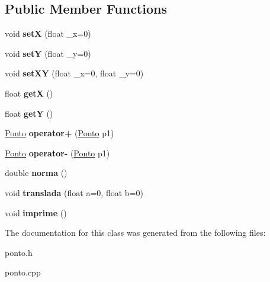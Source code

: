 \subsection*{Public Member Functions}
\begin{DoxyCompactItemize}
\item 
\mbox{\label{class_ponto_abfab19c004021c98c75b27b933498466}} 
void {\bfseries setX} (float \+\_\+x=0)
\item 
\mbox{\label{class_ponto_a9b87ab5a7ba74d55d060ed6257af1ebc}} 
void {\bfseries setY} (float \+\_\+y=0)
\item 
\mbox{\label{class_ponto_aa0f87ed597205dbd1cdc442b3ad04772}} 
void {\bfseries set\+XY} (float \+\_\+x=0, float \+\_\+y=0)
\item 
\mbox{\label{class_ponto_ae4823d6ee26ff3448ee403d26a3c6d2f}} 
float {\bfseries getX} ()
\item 
\mbox{\label{class_ponto_ab120600953e6544301223b9b05a43ee5}} 
float {\bfseries getY} ()
\item 
\mbox{\label{class_ponto_a908e3d5ead13c920159564b2b1844c5f}} 
\hyperlink{class_ponto}{Ponto} {\bfseries operator+} (\hyperlink{class_ponto}{Ponto} p1)
\item 
\mbox{\label{class_ponto_a6a8fb877346c4e475ef72fb6c60d060c}} 
\hyperlink{class_ponto}{Ponto} {\bfseries operator-\/} (\hyperlink{class_ponto}{Ponto} p1)
\item 
\mbox{\label{class_ponto_aabf21d159fc5b233d5e58d06cc4a6b6c}} 
double {\bfseries norma} ()
\item 
\mbox{\label{class_ponto_a35d0f1af98249f39f74d9342e8ba18ba}} 
void {\bfseries translada} (float a=0, float b=0)
\item 
\mbox{\label{class_ponto_a84758d453e38f237bdf860b6435e9def}} 
void {\bfseries imprime} ()
\end{DoxyCompactItemize}


The documentation for this class was generated from the following files\+:\begin{DoxyCompactItemize}
\item 
ponto.\+h\item 
ponto.\+cpp\end{DoxyCompactItemize}
